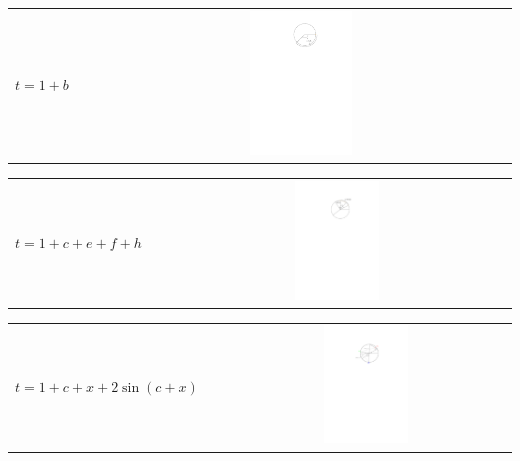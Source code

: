 \documentclass[11pt]{article}
\begin{document}
\begin{center}
    \begin{tabularx}{\textwidth}{lXc}
        \hline
        \multirow{2}{*}{$t = 1+b$} & & \parbox[c]{0.25\textwidth}{\includegraphics[width=0.25\textwidth]{Q2S1_Eq/ub_1.pdf}} \\
    \end{tabularx}
    \begin{tabularx}{\textwidth}{lXc}
        \hline
        \multirow{2}{*}{$t = 1+c+e+f+h$} & & \parbox[c]{0.25\textwidth}{\includegraphics[width=0.25\textwidth]{Q2S1_Eq/ub_2.pdf}} \\
    \end{tabularx}
    \begin{tabularx}{\textwidth}{lXc}
        \hline
        \multirow{2}{*}{$t = 1+c+x+2\sin(c+x)$} & & \parbox[c]{0.3\textwidth}{\includegraphics[width=0.3\textwidth]{Q2S1_Eq/ub_3.pdf}} \\
        \hline
    \end{tabularx}
\end{center}



\end{document}
